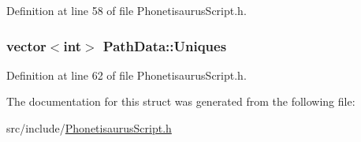 Definition at line 58 of file Phonetisaurus\+Script.\+h.

\subsubsection[{Uniques}]{\setlength{\rightskip}{0pt plus 5cm}vector$<$int$>$ Path\+Data\+::\+Uniques}\hypertarget{struct_path_data_a2e95adbdf68bb757b532c970bb1a2c9a}{}\label{struct_path_data_a2e95adbdf68bb757b532c970bb1a2c9a}


Definition at line 62 of file Phonetisaurus\+Script.\+h.



The documentation for this struct was generated from the following file\+:\begin{DoxyCompactItemize}
\item 
src/include/\hyperlink{_phonetisaurus_script_8h}{Phonetisaurus\+Script.\+h}\end{DoxyCompactItemize}
